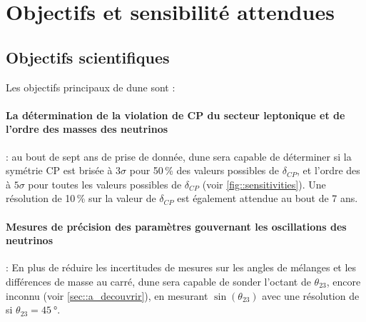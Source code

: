 
  \section{Objectifs et sensibilité attendues}\label{sec::dune}

    \subsection{Objectifs scientifiques}\label{sec::dune_pheno}

      Les objectifs principaux de \gls{dune} sont :
      \paragraph{La détermination de la violation de CP du secteur leptonique et de l'ordre des masses des neutrinos} : au bout de sept ans de prise de donnée, \gls{dune} sera capable de déterminer si la symétrie CP est brisée à $3\sigma$ pour 50\,\% des valeurs possibles de $\delta_{CP}$, et l'ordre des à $5\sigma$ pour toutes les valeurs possibles de $\delta_{CP}$ (voir \autoref{fig::sensitivities}). Une résolution de 10\,\% sur la valeur de $\delta_{CP}$ est également attendue au bout de 7 ans\cite{Collaboration2015}.

      \paragraph{Mesures de précision des paramètres gouvernant les oscillations des neutrinos} : En plus de réduire les incertitudes de mesures sur les angles de mélanges et les différences de masse au carré, \gls{dune} sera capable de sonder l'octant de  $\theta_{23}$, encore inconnu (voir \autoref{sec::a_decouvrir}), en mesurant $\sin(\theta_{23})$ avec une résolution de  si $\theta_{23}=\SI{45}{\degree}$\cite{Collaboration2015}.

